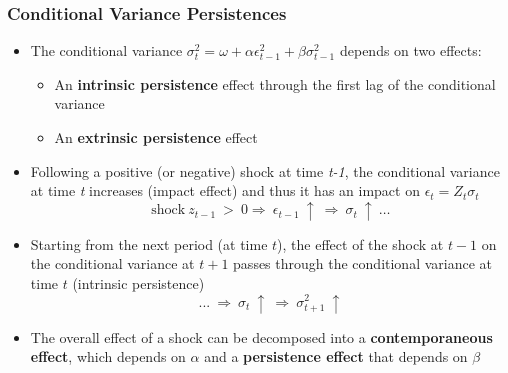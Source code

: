 \documentclass{beamer}
\newcommand{\imfbold}[1]{\textbf{\textcolor{imfblue}{#1}}}
\begin{document}
\begin{frame}
  \frametitle{Conditional Variance Persistences}
  \small
  \begin{itemize}
  \item The conditional variance $\sigma_t^2 = \omega + \alpha \epsilon^2_{t-1} + \beta \sigma^2_{t-1}$ depends on two effects:
    \begin{itemize}
    \item An \textbf{intrinsic persistence} effect through the first lag of the conditional variance
    \item An \textbf{extrinsic persistence} effect
    \end{itemize}    
  \item Following a positive (or negative) shock at time \emph{t-1}, the conditional variance at time \emph{t} increases (impact effect) and thus it has an impact on $\epsilon_t = Z_t \sigma_t$
        $$\text{shock} \ z_{t-1} \ > \ 0 \Rightarrow \ \epsilon_{t-1} \ \uparrow \ \Rightarrow \ \sigma_t \ \uparrow \ \dots$$  
  \item Starting from the next period (at time $t$), the effect of the shock at $t-1$ on the conditional variance at $t+1$ passes through the conditional variance at time $t$ (intrinsic persistence)
    $$... \ \Rightarrow \ \sigma_t \ \uparrow \ \Rightarrow \ \sigma^2_{t+1} \ \uparrow $$    
    \item The overall effect of a shock can be decomposed into a \imfbold{contemporaneous effect}, which depends on $\alpha$ and a \imfbold{persistence effect} that depends on $\beta$    
  \end{itemize}
\end{frame}
\end{document}
